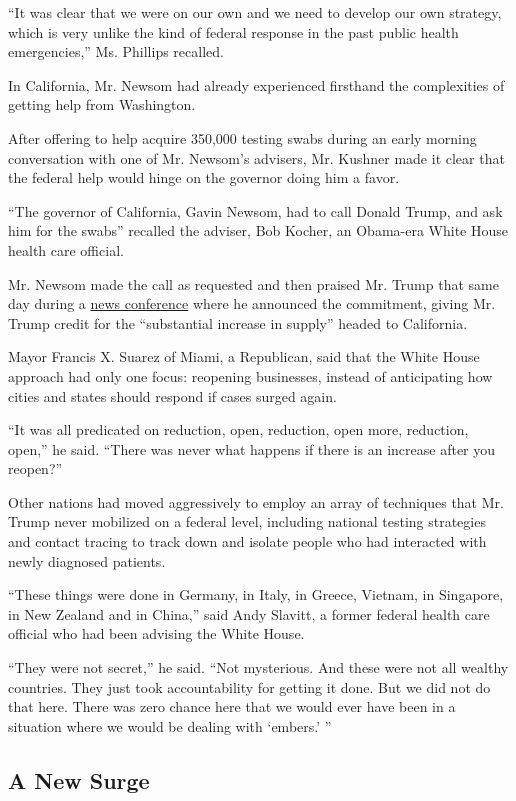 ``It was clear that we were on our own and we need to develop our own
strategy, which is very unlike the kind of federal response in the past
public health emergencies,'' Ms. Phillips recalled.

In California, Mr. Newsom had already experienced firsthand the
complexities of getting help from Washington.

After offering to help acquire 350,000 testing swabs during an early
morning conversation with one of Mr. Newsom's advisers, Mr. Kushner made
it clear that the federal help would hinge on the governor doing him a
favor.

``The governor of California, Gavin Newsom, had to call Donald Trump,
and ask him for the swabs'' recalled the adviser, Bob Kocher, an
Obama-era White House health care official.

Mr. Newsom made the call as requested and then praised Mr. Trump that
same day during a
\href{https://www.facebook.com/CAgovernor/videos/686605895491026/}{news
conference} where he announced the commitment, giving Mr. Trump credit
for the ``substantial increase in supply'' headed to California.

Mayor Francis X. Suarez of Miami, a Republican, said that the White
House approach had only one focus: reopening businesses, instead of
anticipating how cities and states should respond if cases surged again.

``It was all predicated on reduction, open, reduction, open more,
reduction, open,'' he said. ``There was never what happens if there is
an increase after you reopen?''

Other nations had moved aggressively to employ an array of techniques
that Mr. Trump never mobilized on a federal level, including national
testing strategies and contact tracing to track down and isolate people
who had interacted with newly diagnosed patients.

``These things were done in Germany, in Italy, in Greece, Vietnam, in
Singapore, in New Zealand and in China,'' said Andy Slavitt, a former
federal health care official who had been advising the White House.

``They were not secret,'' he said. ``Not mysterious. And these were not
all wealthy countries. They just took accountability for getting it
done. But we did not do that here. There was zero chance here that we
would ever have been in a situation where we would be dealing with
`embers.' ''

\hypertarget{a-new-surge}{%
\subsection{A New Surge}\label{a-new-surge}}

